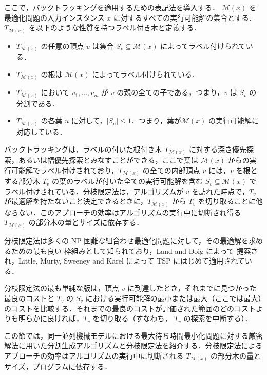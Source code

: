 \documentclass[12pt]{optlab-bachelor}
\begin{document}
ここで，バックトラッキングを適用するための表記法を導入する．
$\mathcal{M}(x)$ を最適化問題の入力インスタンス $x$ に対するすべての実行可能解の集合とする．$T_{\mathcal{M}(x)}$ を以下のような性質を持つラベル付き木と定義する．
\begin{itemize}
  \item $T_{\mathcal{M}(x)}$ の任意の頂点 $v$ は集合 $S_v \subseteq \mathcal{M}(x)$ によってラベル付けられている．
  \item $T_{\mathcal{M}(x)}$ の根は $\mathcal{M}(x)$ によってラベル付けられている．
  \item $T_{\mathcal{M}(x)}$ において $v_1,\ldots,v_m$ が $v$ の親の全ての子である，つまり，$v$ は $S_v$ の分割である．
  \item $T_{\mathcal{M}(x)}$ の各葉 $u$ に対して，$|S_u| \le 1$．つまり，葉が$\mathcal{M}(x)$ の実行可能解に対応している．
\end{itemize}

バックトラッキングは，ラベルの付いた根付き木 $T_{\mathcal{M}(x)}$ に対する深さ優先探索，あるいは幅優先探索とみなすことができる，ここで葉は $\mathcal{M}(x)$ からの実行可能解でラベル付けされており，$T_{\mathcal{M}(x)}$ の全ての内部頂点 $v$ には，$v$ を根とする部分木 $T_v$ の葉のラベルが付いた全ての実行可能解を含む $S_v \subseteq \mathcal{M}(x)$ でラベル付けされている．分枝限定法は，アルゴリズムが $v$ を訪れた時点で，$T_v$ が最適解を持たないこと決定できるときに，$T_{\mathcal{M}(x)}$ から $T_v$ を切り取ることに他ならない．このアプローチの効率はアルゴリズムの実行中に切断され得る $T_{\mathcal{M}(x)}$ の部分木の量とサイズに依存する．

分枝限定法は多くの NP 困難な組合わせ最適化問題に対して，その最適解を求めるための最も良い
枠組みとして知られており，Land and Doig \cite{BandB} によって
提案され，Little, Murty, Sweeney and Karel \cite{BandB2}
によって TSP にはじめて適用されている．

分枝限定法の最も単純な版は，頂点 $v$ に到達したとき，それまでに見つかった最良のコストと $T_v$
の $S_v$ における実行可能解の最小または最大（ここでは最大）のコストを比較する．それまでの最良のコストが評価された範囲のどのコストよりも明らかに良ければ，$T_v$ を切り取る（すなわち， $T_v$ の探索を中断する）．


この節では，同一並列機械モデルにおける最大待ち時間最小化問題に対する厳密解法に用いた分割生成アルゴリズムと分枝限定法を紹介する．分枝限定法によるアプローチの効率はアルゴリズムの実行中に切断される $T_{\mathcal{M}(x)}$ の部分木の量とサイズ，プログラムに依存する．%
\end{document}
